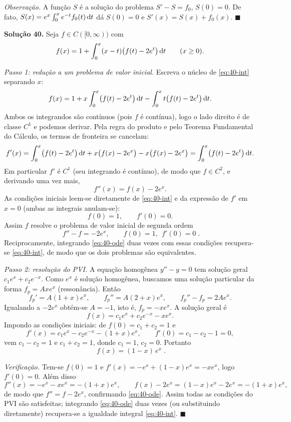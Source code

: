 \emph{Observação.} A função $S$ é a solução do problema $S'-S=f_0$, $S(0)=0$. De fato, $S(x)=e^x\int_0^x e^{-t}f_0(t)\,\mathrm{d} t$ dá $S(0)=0$ e $S'(x)=S(x)+f_0(x)$. \qquad$\blacksquare$


\bigskip\noindent\textbf{Solução 40.}\quad
Seja $f\in C([0,\infty))$ com
\begin{equation}\label{eq:40-int}
f(x)=1+\int_0^x (x-t)\bigl(f(t)-2e^t\bigr)\,\mathrm{d} t\qquad(x\ge0).
\end{equation}

\emph{Passo 1: redução a um problema de valor inicial.}
Escreva o núcleo de \eqref{eq:40-int} separando $x$:
\[
f(x)=1+x\int_0^x\bigl(f(t)-2e^t\bigr)\,\mathrm{d} t-\int_0^x t\bigl(f(t)-2e^t\bigr)\,\mathrm{d} t.
\]
Ambos os integrandos são contínuos (pois $f$ é contínua), logo o lado direito é de classe $C^1$ e podemos derivar. Pela regra do produto e pelo Teorema Fundamental do Cálculo, os termos de fronteira se cancelam:
\[
f'(x)=\int_0^x\bigl(f(t)-2e^t\bigr)\,\mathrm{d} t+x\bigl(f(x)-2e^x\bigr)-x\bigl(f(x)-2e^x\bigr)
=\int_0^x\bigl(f(t)-2e^t\bigr)\,\mathrm{d} t.
\]
Em particular $f'$ é $C^1$ (seu integrando é contínuo), de modo que $f\in C^2$, e derivando uma vez mais,
\begin{equation}\label{eq:40-ode}
f''(x)=f(x)-2e^x.
\end{equation}
As condições iniciais leem-se diretamente de \eqref{eq:40-int} e da expressão de $f'$ em $x=0$ (ambas as integrais anulam-se):
\[
f(0)=1,\qquad f'(0)=0.
\]
Assim $f$ resolve o problema de valor inicial de segunda ordem
\[
\boxed{\;f''-f=-2e^x,\qquad f(0)=1,\ \ f'(0)=0\;}.
\]
Reciprocamente, integrando \eqref{eq:40-ode} duas vezes com essas condições recupera-se \eqref{eq:40-int}, de modo que os dois problemas são equivalentes.

\emph{Passo 2: resolução do PVI.}
A equação homogênea $y''-y=0$ tem solução geral $c_1e^x+c_2e^{-x}$. Como $e^x$ é solução homogênea, buscamos uma solução particular da forma $f_p=Axe^x$ (ressonância). Então
\[
f_p'=A(1+x)e^x,\qquad f_p''=A(2+x)e^x,\qquad f_p''-f_p=2Ae^x.
\]
Igualando a $-2e^x$ obtém-se $A=-1$, isto é, $f_p=-xe^x$. A solução geral é
\[
f(x)=c_1e^x+c_2e^{-x}-xe^x.
\]
Impondo as condições iniciais: de $f(0)=c_1+c_2=1$ e
\[
f'(x)=c_1e^x-c_2e^{-x}-(1+x)e^x,\qquad f'(0)=c_1-c_2-1=0,
\]
vem $c_1-c_2=1$ e $c_1+c_2=1$, donde $c_1=1$, $c_2=0$. Portanto
\[
\boxed{\;f(x)=(1-x)\,e^{x}\;}.
\]

\emph{Verificação.} Tem-se $f(0)=1$ e $f'(x)=-e^x+(1-x)e^x=-xe^x$, logo $f'(0)=0$. Além disso
\[
f''(x)=-e^x-xe^x=-(1+x)e^x,\qquad f(x)-2e^x=(1-x)e^x-2e^x=-(1+x)e^x,
\]
de modo que $f''=f-2e^x$, confirmando \eqref{eq:40-ode}. Assim todas as condições do PVI são satisfeitas; integrando \eqref{eq:40-ode} duas vezes (ou substituindo diretamente) recupera-se a igualdade integral \eqref{eq:40-int}. \qquad$\blacksquare$

